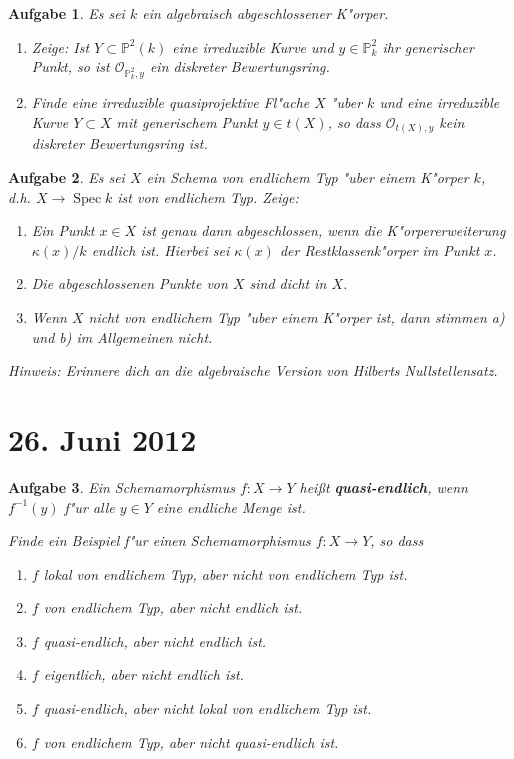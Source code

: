 \documentclass[paper = A4, fontsize=12pt, numbers=noendperiod, chapterprefix=true]{scrbook}
\theoremstyle{break}
\newtheorem{Aufg}{Aufgabe}
\theoremstyle{nonumberbreak}
\theoremstyle{nonumberplain}
\DeclareMathOperator{\Spec}{Spec}
\newcommand{\IP}{\mathbb{P}}%
\newcommand{\calO}{\mathcal{O}}
\begin{document}
\begin{Aufg}
Es sei $k$ ein algebraisch abgeschlossener K"orper. 
\begin{enumerate}%
 \item Zeige: Ist $Y \subset \IP^2(k)$ eine irreduzible Kurve und $y \in \IP^2_k$ ihr generischer Punkt, so ist $\calO_{\IP^2_k,y}$ ein diskreter Bewertungsring.
 \item Finde eine irreduzible quasiprojektive Fl"ache $X$ "uber $k$ und eine irreduzible Kurve $Y \subset X$ mit generischem Punkt $y \in t(X)$, so dass $\calO_{t(X),y}$ kein diskreter Bewertungsring ist.
\end{enumerate}
\end{Aufg}

\begin{Aufg}
Es sei $X$ ein Schema von endlichem Typ "uber einem K"orper $k$, d.h. $X \to \Spec k$ ist von endlichem Typ. Zeige:
\begin{enumerate}%
 \item Ein Punkt $x\in X$ ist genau dann abgeschlossen, wenn die K"orpererweiterung $\kappa(x) / k$ endlich ist. Hierbei sei $\kappa(x)$ der Restklassenk"orper im Punkt $x$.
 \item Die abgeschlossenen Punkte von $X$ sind dicht in $X$.
 \item Wenn $X$ nicht von endlichem Typ "uber einem K"orper ist, dann stimmen a) und b) im Allgemeinen nicht.
\end{enumerate}
\textit{Hinweis: Erinnere dich an die algebraische Version von Hilberts Nullstellensatz.}
\end{Aufg}


\newpage
\section{26. Juni 2012}
\setcounter{Aufg}{0}
\setcounter{Loes}{0}

\begin{Aufg}
Ein Schemamorphismus $f\colon X\to Y$ hei\ss t \textbf{quasi-endlich}, wenn $f^{-1}(y)$ f"ur alle $y\in Y$ eine endliche Menge ist.

Finde ein Beispiel f"ur einen Schemamorphismus $f\colon X\to Y$, so dass
\begin{enumerate}%
 \item $f$ lokal von endlichem Typ, aber nicht von endlichem Typ ist.
 \item $f$ von endlichem Typ, aber nicht endlich ist.
 \item $f$ quasi-endlich, aber nicht endlich ist.
 \item $f$ eigentlich, aber nicht endlich ist.
 \item $f$ quasi-endlich, aber nicht lokal von endlichem Typ ist.
 \item $f$ von endlichem Typ, aber nicht quasi-endlich ist.
\end{enumerate}
\end{Aufg}
\end{document}
